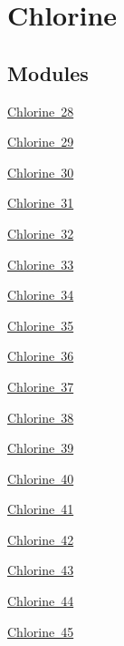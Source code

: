 \hypertarget{group___isotope_const-_chlorine}{}\section{Chlorine}
\label{group___isotope_const-_chlorine}
\subsection*{Modules}
\begin{DoxyCompactItemize}
\item 
\mbox{\hyperlink{group___isotope_const-_chlorine-_cl28}{Chlorine 28}}
\item 
\mbox{\hyperlink{group___isotope_const-_chlorine-_cl29}{Chlorine 29}}
\item 
\mbox{\hyperlink{group___isotope_const-_chlorine-_cl30}{Chlorine 30}}
\item 
\mbox{\hyperlink{group___isotope_const-_chlorine-_cl31}{Chlorine 31}}
\item 
\mbox{\hyperlink{group___isotope_const-_chlorine-_cl32}{Chlorine 32}}
\item 
\mbox{\hyperlink{group___isotope_const-_chlorine-_cl33}{Chlorine 33}}
\item 
\mbox{\hyperlink{group___isotope_const-_chlorine-_cl34}{Chlorine 34}}
\item 
\mbox{\hyperlink{group___isotope_const-_chlorine-_cl35}{Chlorine 35}}
\item 
\mbox{\hyperlink{group___isotope_const-_chlorine-_cl36}{Chlorine 36}}
\item 
\mbox{\hyperlink{group___isotope_const-_chlorine-_cl37}{Chlorine 37}}
\item 
\mbox{\hyperlink{group___isotope_const-_chlorine-_cl38}{Chlorine 38}}
\item 
\mbox{\hyperlink{group___isotope_const-_chlorine-_cl39}{Chlorine 39}}
\item 
\mbox{\hyperlink{group___isotope_const-_chlorine-_cl40}{Chlorine 40}}
\item 
\mbox{\hyperlink{group___isotope_const-_chlorine-_cl41}{Chlorine 41}}
\item 
\mbox{\hyperlink{group___isotope_const-_chlorine-_cl42}{Chlorine 42}}
\item 
\mbox{\hyperlink{group___isotope_const-_chlorine-_cl43}{Chlorine 43}}
\item 
\mbox{\hyperlink{group___isotope_const-_chlorine-_cl44}{Chlorine 44}}
\item 
\mbox{\hyperlink{group___isotope_const-_chlorine-_cl45}{Chlorine 45}}

\end{DoxyCompactItemize}
